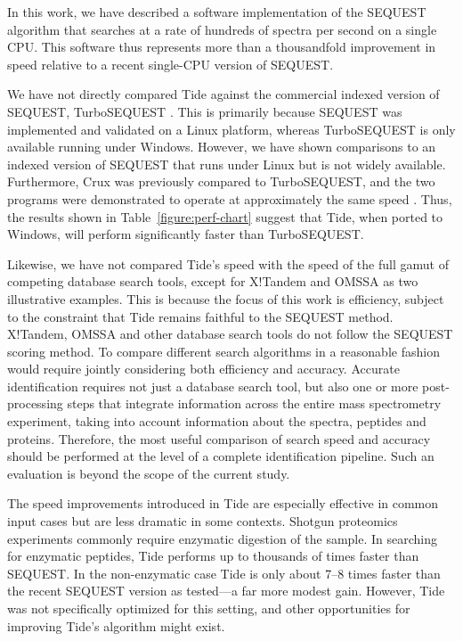 In this work, we have described a software implementation of the
SEQUEST algorithm that searches at a rate of hundreds of spectra per
second on a single CPU.  This software thus represents more than a
thousandfold improvement in speed relative to a recent single-CPU
version of SEQUEST.

We have not directly compared Tide against the commercial indexed
version of SEQUEST, TurboSEQUEST \cite{lundgren:protein}.  This is
primarily because SEQUEST was implemented and validated on a Linux
platform, whereas TurboSEQUEST is only available running under
Windows.  However, we have shown comparisons to an indexed version of
SEQUEST that runs under Linux but is not widely available.
Furthermore, Crux was previously compared to TurboSEQUEST, and the two
programs were demonstrated to operate at approximately the same speed
\cite{park:rapid}. Thus, the results shown in
Table~\ref{figure:perf-chart} suggest that Tide, when ported to Windows,
will perform significantly faster than TurboSEQUEST.

Likewise, we have not compared Tide's speed with the speed of the full
gamut of competing database search tools, except for X!Tandem and
OMSSA as two illustrative examples.  This is because the focus of this
work is efficiency, subject to the constraint that Tide remains
faithful to the SEQUEST method. X!Tandem, OMSSA and other database
search tools do not follow the SEQUEST scoring method. To compare
different search algorithms in a reasonable fashion would require
jointly considering both efficiency and accuracy.  Accurate
identification requires not just a database search tool, but also one
or more post-processing steps that integrate information across the
entire mass spectrometry experiment, taking into account information
about the spectra, peptides and proteins.  Therefore, the most useful
comparison of search speed and accuracy should be performed at the
level of a complete identification pipeline.  Such an evaluation is
beyond the scope of the current study.

The speed improvements introduced in Tide are especially effective in
common input cases but are less dramatic in some contexts.  Shotgun
proteomics experiments commonly require enzymatic digestion of the
sample. In searching for enzymatic peptides, Tide performs up to
thousands of times faster than SEQUEST. In the non-enzymatic case Tide
is only about 7--8 times faster than the recent SEQUEST version as
tested---a far more modest gain. However, Tide was not specifically
optimized for this setting, and other opportunities for improving
Tide's algorithm might exist.

